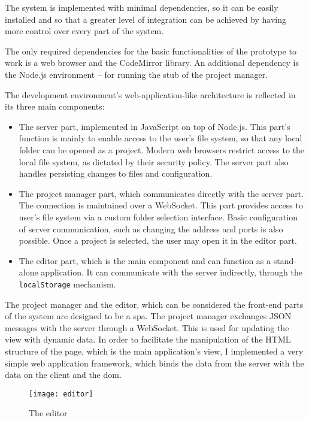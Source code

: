 The system is implemented with minimal dependencies, so it can be easily
installed and so that a greater level of integration can be achieved by having more control over every part of the system.

The only required dependencies for the basic functionalities of the prototype to
work is a web browser and the CodeMirror library. An additional dependency is the Node.js environment -- for running the stub of the project manager.

The development environment's web-application-like architecture is reflected in its three main components:
\begin{itemize}
    \item The server part, implemented in JavaScript on top of Node.js. This
      part's function is mainly to enable access to the user's file system, so that any local folder can be opened as a project. Modern web browsers restrict access to the local file system, as dictated by their security policy. The server part also handles persisting changes to files and configuration.
    \item The project manager part, which communicates directly with the server
      part. The connection is maintained over a WebSocket\cite{mdn_websockets}. This part provides access to user's file system via a custom folder selection interface. Basic configuration of server communication, such as changing the address and ports is also possible. Once a project is selected, the user may open it in the editor part.
    \item The editor part, which is the main component and can function as a
      stand-alone application. It can communicate with the server indirectly,
      through the \texttt{localStorage}
      mechanism\cite{mdn_localstorage}.
\end{itemize}

The project manager and the editor, which can be considered the front-end parts
of the system are designed to be a
\acrlong{spa}\cite{spa_wikipedia}. The
project manager exchanges JSON messages with the server through a
WebSocket. This is used for updating the view with dynamic data. In order to
facilitate the manipulation of the HTML structure of the page, which is the main
application's view, I implemented a very simple web application framework, which
binds the data from the server with the data on the client and the
\acrlong{dom}\cite[Chapter~13]{eloquentjs}.

\begin{figure}[h!]
\centering \texttt{[image: editor]}
\caption{The editor}
\label{fig:editor}
\end{figure}


